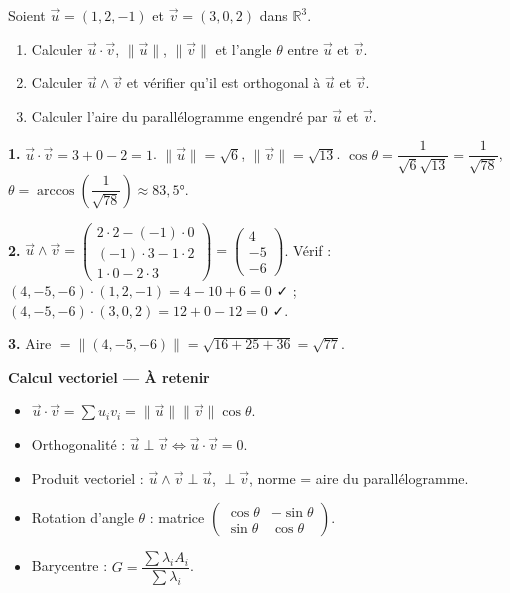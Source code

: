 \documentclass[11pt,a4paper,twoside]{book}
\newcommand{\R}{\mathbb{R}}
\begin{document}
\begin{exercicebox}
Soient $\vec{u}=(1,2,-1)$ et $\vec{v}=(3,0,2)$ dans $\R^3$.
\begin{enumerate}
  \item Calculer $\vec{u}\cdot\vec{v}$, $\|\vec{u}\|$, $\|\vec{v}\|$ et l'angle $\theta$ entre $\vec{u}$ et $\vec{v}$.
  \item Calculer $\vec{u}\wedge\vec{v}$ et vérifier qu'il est orthogonal à $\vec{u}$ et $\vec{v}$.
  \item Calculer l'aire du parallélogramme engendré par $\vec{u}$ et $\vec{v}$.
\end{enumerate}
\end{exercicebox}

\begin{correctionbox}[Correction]
\textbf{1.} $\vec{u}\cdot\vec{v}=3+0-2=1$. $\|\vec{u}\|=\sqrt{6}$, $\|\vec{v}\|=\sqrt{13}$.
$\cos\theta=\dfrac{1}{\sqrt{6}\sqrt{13}}=\dfrac{1}{\sqrt{78}}$, $\theta=\arccos\!\left(\dfrac{1}{\sqrt{78}}\right)\approx83{,}5°$.

\textbf{2.} $\vec{u}\wedge\vec{v}=\begin{pmatrix}2\cdot2-(-1)\cdot0\\(-1)\cdot3-1\cdot2\\1\cdot0-2\cdot3\end{pmatrix}=\begin{pmatrix}4\\-5\\-6\end{pmatrix}$.
Vérif : $(4,{-5},{-6})\cdot(1,2,{-1})=4-10+6=0$ ✓ ; $(4,{-5},{-6})\cdot(3,0,2)=12+0-12=0$ ✓.

\textbf{3.} Aire $=\|(4,-5,-6)\|=\sqrt{16+25+36}=\sqrt{77}$.
\end{correctionbox}

\begin{retenirbox}
\textbf{Calcul vectoriel — À retenir}
\begin{itemize}
  \item $\vec{u}\cdot\vec{v}=\sum u_i v_i = \|\vec{u}\|\|\vec{v}\|\cos\theta$.
  \item Orthogonalité : $\vec{u}\perp\vec{v}\iff\vec{u}\cdot\vec{v}=0$.
  \item Produit vectoriel : $\vec{u}\wedge\vec{v}\perp\vec{u}$, $\perp\vec{v}$, norme = aire du parallélogramme.
  \item Rotation d'angle $\theta$ : matrice $\begin{pmatrix}\cos\theta&-\sin\theta\\\sin\theta&\cos\theta\end{pmatrix}$.
  \item Barycentre : $G=\dfrac{\sum\lambda_i A_i}{\sum\lambda_i}$.
\end{itemize}
\end{retenirbox}
\end{document}
